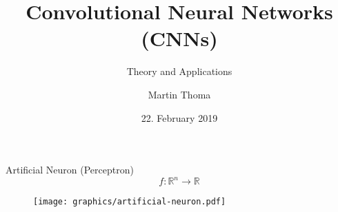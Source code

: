 \documentclass{beamer}
\begin{document}
\title{Convolutional Neural Networks (CNNs)}
\subtitle{Theory and Applications}
\author{Martin Thoma}
\date{22. February 2019}
\subject{Machine Learning, AI, Neural Networks, Convolutional Neural Networks}

\frame{\titlepage}

\begin{frame}{Artificial Neuron (Perceptron)}
    $$f: \mathbb{R}^n \rightarrow \mathbb{R}$$
    \begin{figure}[ht]
        \centering
        \texttt{[image: graphics/artificial-neuron.pdf]}
    \end{figure}
\end{frame}
\end{document}
